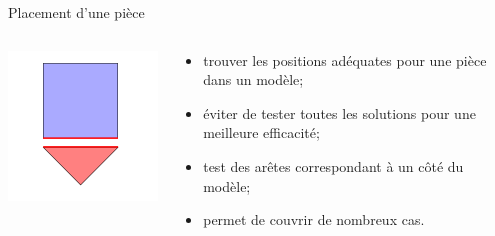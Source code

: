 \documentclass{beamer}
\begin{document}
\begin{frame}{Placement d'une pièce}

	\begin{columns}[c]
		\begin{column}{4cm}
    		\includegraphics[width=5cm]{place_figure_exacte_match}
  		\end{column}
		\begin{column}{6.5cm}
			\begin{itemize}
				\item trouver les positions adéquates pour une pièce dans un modèle;
				\item éviter de tester toutes les solutions pour une meilleure efficacité;
				\item test des arêtes correspondant à un côté du modèle;
				\item permet de couvrir de nombreux cas.
			\end{itemize}
  		\end{column}
  		
	\end{columns}

\end{frame}
\end{document}
